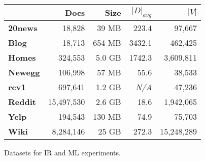 \begin{figure}
\centering
{\small
\begin{tabular}{|l|r|r|r|r|}
    \hline & \textbf{Docs} & \textbf{Size} & \textbf{$|D|_{avg}$} & \textbf{$|V|$} \\
    \hline
    \textbf{20news}  & 18,828     & 39 MB  & 223.4      & 97,667     \\
    \textbf{Blog}    & 18,713     & 654 MB & 3432.1     & 462,425    \\
    \textbf{Homes}   & 324,553    & 5.0 GB & 1742.3     & 3,609,811  \\
    \textbf{Newegg}  & 106,998    & 57 MB  & 55.6       & 38,533     \\
    \textbf{rcv1}    & 697,641    & 1.2 GB & \emph{N/A} & 47,236 \\
    \textbf{Reddit}  & 15,497,530 & 2.6 GB & 18.6       & 1,942,065  \\
    \textbf{Yelp}    & 194,543    & 130 MB & 74.9       & 75,703 \\
    \textbf{Wiki}    & 8,284,146  & 25 GB  & 272.3      & 15,248,289 \\
    \hline
\end{tabular}
}
\caption{Datasets for IR and ML experiments.}
\label{fig:datasets}
\end{figure}
